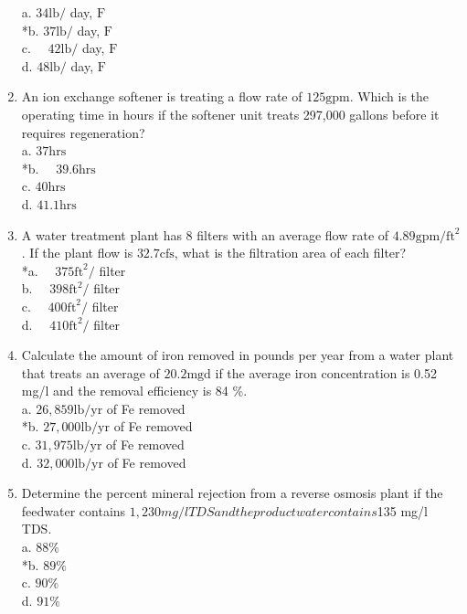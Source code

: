 \begin{enumerate}
\begin{itemize}
  \end{itemize}
a. $34 \mathrm{lb} /$ day, $\mathrm{F}$\\
*b. $37 \mathrm{lb} /$ day, $\mathrm{F}$\\
c. $\quad 42 \mathrm{lb} /$ day, $\mathrm{F}$\\
d. $48 \mathrm{lb} /$ day, $\mathrm{F}$\\
\item An ion exchange softener is treating a flow rate of $125 \mathrm{gpm}$. Which is the operating time in hours if the softener unit treats 297,000 gallons before it requires regeneration?\\
a. $37 \mathrm{hrs}$\\
*b. $\quad 39.6 \mathrm{hrs}$\\
c. $40 \mathrm{hrs}$\\
d. $41.1 \mathrm{hrs}$
\item A water treatment plant has 8 filters with an average flow rate of $4.89 \mathrm{gpm} / \mathrm{ft}^{2}$. If the plant flow is $32.7 \mathrm{cfs}$, what is the filtration area of each filter?\\
*a. $\quad 375 \mathrm{ft}^{2} /$ filter\\
b. $\quad 398 \mathrm{ft}^{2} /$ filter\\
c. $\quad 400 \mathrm{ft}^{2} /$ filter\\
d. $\quad 410 \mathrm{ft}^{2} /$ filter\\
\item Calculate the amount of iron removed in pounds per year from a water plant that treats an average of $20.2 \mathrm{mgd}$ if the average iron concentration is 0.52 mg/l and the removal efficiency is 84 \%.\\
a. $26,859 \mathrm{lb} / \mathrm{yr}$ of Fe removed\\
*b. $27,000 \mathrm{lb} / \mathrm{yr}$ of Fe removed\\
c. $31,975 \mathrm{lb} / \mathrm{yr}$ of Fe removed\\
d. $32,000 \mathrm{lb} / \mathrm{yr}$ of Fe removed\\
\item Determine the percent mineral rejection from a reverse osmosis plant if the feedwater contains $1,230 mg/l TDS and the product water contains $135 mg/l TDS.\\
a. $88 \%$\\
*b. $89 \%$\\
c. $90 \%$\\
d. $91 \%$\\

\end{enumerate}
